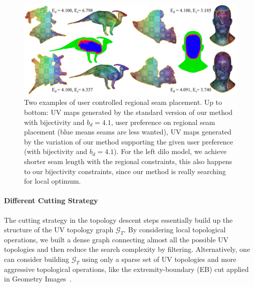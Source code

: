 \begin{figure}[!h]
\centering
\includegraphics[width=\linewidth]{fig/regional_user.png}
\caption{Two examples of user controlled regional seam placement. Up to bottom: UV maps generated by the standard version of our method with bijectivity and $b_d = 4.1$, user preference on regional seam placement (blue means seams are less wanted), UV maps generated by the variation of our method supporting the given user preference (with bijectivity and $b_d = 4.1$). For the left dilo model, we achieve shorter seam length with the regional constraints, this also happens to our bijectivity constraints, since our method is really searching for local optimum.}
\label{fig:regional_seam_placement}
\end{figure}


\paragraph{Different Cutting Strategy}
The cutting strategy in the topology descent steps essentially build up the structure of the UV topology graph $\mathcal{G}_T$. By considering local topological operations, we built a dense graph connecting almost all the possible UV topologies and then reduce the search complexity by filtering. Alternatively, one can consider building $\mathcal{G}_T$ using only a sparse set of UV topologies and more aggressive topological operations, like the extremity-boundary (EB) cut applied in Geometry Images~\cite{Gu2002Geometry}.

